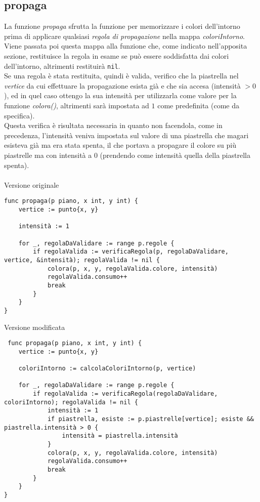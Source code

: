 \documentclass{article}
\begin{document}
\subsection{propaga}
La funzione \textit{propaga} sfrutta la funzione  per memorizzare i colori dell'intorno prima di applicare qualsiasi \textit{regola di propagazione} nella mappa \textit{coloriIntorno}.
\\
Viene passata poi questa mappa alla funzione  che, come indicato nell'apposita sezione, restituisce la regola in esame se può essere soddisfatta dai colori dell'intorno, altrimenti restituirà \texttt{nil}.\\
Se una regola è stata restituita, quindi è valida, verifico che la piastrella nel \textit{vertice} da cui effettuare la propagazione esista già e che sia accesa (intensità \(> 0\)), ed in quel caso ottengo la sua intensità per utilizzarla come valore per la funzione \textit{colora()}, altrimenti sarà impostata ad \(1\) come predefinita (come da specifica).\\
Questa verifica è risultata necessaria in quanto non facendola, come in precedenza, l'intensità veniva impostata sul valore di una piastrella che magari esisteva già ma era stata spenta, il che portava a propagare il colore su più piastrelle ma con intensità a \(0\) (prendendo come intensità quella della piastrella spenta).
\\ \\
Versione originale
\begin{verbatim}
func propaga(p piano, x int, y int) {
	vertice := punto{x, y}

	intensità := 1

	for _, regolaDaValidare := range p.regole {
		if regolaValida := verificaRegola(p, regolaDaValidare, vertice, &intensità); regolaValida != nil {
			colora(p, x, y, regolaValida.colore, intensità)
			regolaValida.consumo++
			break
		}
	}
} 
\end{verbatim}

Versione modificata
\begin{verbatim}
 func propaga(p piano, x int, y int) {
	vertice := punto{x, y}

	coloriIntorno := calcolaColoriIntorno(p, vertice)

	for _, regolaDaValidare := range p.regole {
		if regolaValida := verificaRegola(regolaDaValidare, coloriIntorno); regolaValida != nil {
			intensità := 1
			if piastrella, esiste := p.piastrelle[vertice]; esiste && piastrella.intensità > 0 {
				intensità = piastrella.intensità
			}
			colora(p, x, y, regolaValida.colore, intensità)
			regolaValida.consumo++
			break
		}
	}
} 
\end{verbatim}
\end{document}
